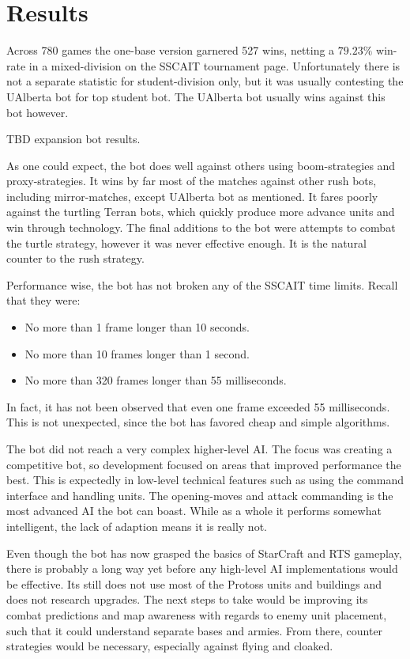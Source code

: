 \chapter{Results}
Across 780 games the one-base version garnered 527 wins, netting a $79.23\%$ win-rate in a mixed-division on the SSCAIT tournament page. Unfortunately there is not a separate statistic for student-division only, but it was usually contesting the UAlberta bot for top student bot. The UAlberta bot usually wins against this bot however.

TBD expansion bot results.

As one could expect, the bot does well against others using boom-strategies and proxy-strategies. It wins by far most of the matches against other rush bots, including mirror-matches, except UAlberta bot as mentioned. It fares poorly against the turtling Terran bots, which quickly produce more advance units and win through technology. The final additions to the bot were attempts to combat the turtle strategy, however it was never effective enough. It is the natural counter to the rush strategy.

Performance wise, the bot has not broken any of the SSCAIT time limits. Recall that they were:
\begin{itemize}
	\item No more than 1 frame longer than 10 seconds.
	\item No more than 10 frames longer than 1 second.
	\item No more than 320 frames longer than 55 milliseconds.
\end{itemize}
In fact, it has not been observed that even one frame exceeded 55 milliseconds. This is not unexpected, since the bot has favored cheap and simple algorithms.

The bot did not reach a very complex higher-level AI. The focus was creating a competitive bot, so development focused on areas that improved performance the best. This is expectedly in low-level technical features such as using the command interface and handling units. The opening-moves and attack commanding is the most advanced AI the bot can boast.  While as a whole it performs somewhat intelligent, the lack of adaption means it is really not.

Even though the bot has now grasped the basics of StarCraft and RTS gameplay, there is probably a long way yet before any high-level AI implementations would be effective. Its still does not use most of the Protoss units and buildings and does not research upgrades. The next steps to take would be improving its combat predictions and map awareness with regards to enemy unit placement, such that it could understand separate bases and armies. From there, counter strategies would be necessary, especially against flying and cloaked.


